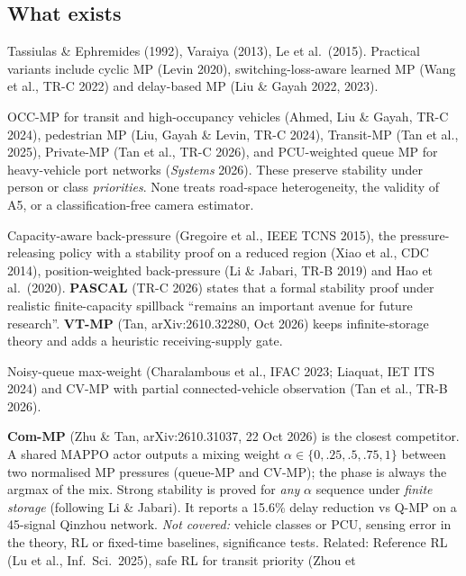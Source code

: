 \documentclass[11pt,a4paper]{article}
\begin{document}
\subsection{What exists}
\begin{description}[leftmargin=0pt,itemsep=3pt]
\item[Max-pressure foundations.] Tassiulas \& Ephremides (1992), Varaiya (2013), Le et al.\
  (2015). Practical variants include cyclic MP (Levin 2020), switching-loss-aware learned MP
  (Wang et al., TR-C 2022) and delay-based MP (Liu \& Gayah 2022, 2023).
\item[Weighted / priority MP.] OCC-MP for transit and high-occupancy vehicles (Ahmed, Liu
  \& Gayah, TR-C 2024), pedestrian MP (Liu, Gayah \& Levin, TR-C 2024), Transit-MP (Tan et
  al., 2025), Private-MP (Tan et al., TR-C 2026), and PCU-weighted queue MP for heavy-vehicle
  port networks (\emph{Systems} 2026). These preserve stability under person or class
  \emph{priorities}. None treats road-space heterogeneity, the validity of A5, or a
  classification-free camera estimator.
\item[Finite storage / spillback.] Capacity-aware back-pressure (Gregoire et al., IEEE TCNS
  2015), the pressure-releasing policy with a stability proof on a reduced region (Xiao et
  al., CDC 2014), position-weighted back-pressure (Li \& Jabari, TR-B 2019) and Hao et al.\
  (2020). \textbf{PASCAL} (TR-C 2026) states that a formal stability proof under realistic
  finite-capacity spillback ``remains an important avenue for future research''.
  \textbf{VT-MP} (Tan, arXiv:2610.32280, Oct 2026) keeps infinite-storage theory and adds a
  heuristic receiving-supply gate.
\item[Imperfect information.] Noisy-queue max-weight (Charalambous et al., IFAC 2023;
  Liaquat, IET ITS 2024) and CV-MP with partial connected-vehicle observation (Tan et al.,
  TR-B 2026).
\item[Stability-preserving RL.] \textbf{Com-MP} (Zhu \& Tan, arXiv:2610.31037, 22 Oct 2026)
  is the closest competitor. A shared MAPPO actor outputs a mixing weight
  $\alpha\in\{0,.25,.5,.75,1\}$ between two normalised MP pressures (queue-MP and CV-MP); the
  phase is always the argmax of the mix. Strong stability is proved for \emph{any} $\alpha$
  sequence under \emph{finite storage} (following Li \& Jabari). It reports a 15.6\% delay
  reduction vs Q-MP on a 45-signal Qinzhou network. \emph{Not covered:} vehicle classes or
  PCU, sensing error in the theory, RL or fixed-time baselines, significance tests.
  Related: Reference RL (Lu et al., Inf.\ Sci.\ 2025), safe RL for transit priority (Zhou et

\end{description}
\end{document}
